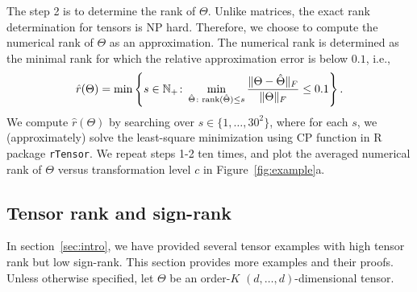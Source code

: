 \documentclass[11pt]{article}
\theoremstyle{plain}
\theoremstyle{definition}
\def\rank{\textup{rank}}
\begin{document}
The step 2 is to determine the rank of $\Theta$. Unlike matrices, the exact rank determination for tensors is NP hard. Therefore, we choose to compute the numerical rank of $\Theta$ as an approximation.  The numerical rank is determined as the minimal rank for which the relative approximation error is below $0.1$, i.e.,
\begin{equation}\label{eq:numeric}
 \hat r(\Theta)=\min\left\{s\in\mathbb{N}_{+}\colon \min_{\hat \Theta\colon \rank(\hat \Theta)\leq s}{\FnormSize{}{\Theta-\hat \Theta}\over \FnormSize{}{\Theta}} \leq 0.1\right\}.
\end{equation}
We compute $\hat r(\Theta)$ by searching over $s\in\{1,\ldots,30^2\}$, where for each $s$, we (approximately) solve the least-square minimization using CP function in R package {\tt rTensor}. 
We repeat steps 1-2 ten times, and plot the averaged numerical rank of $\Theta$ versus transformation level $c$ in Figure~\ref{fig:example}a.  

\subsection{Tensor rank and sign-rank}\label{sec:high-rank}
In section~\ref{sec:intro}, we have provided several tensor examples with high tensor rank but low sign-rank. This section provides more examples and their proofs. 
Unless otherwise specified, let $\Theta$ be an order-$K$ $(d,\ldots,d)$-dimensional tensor. \\
\end{document}
